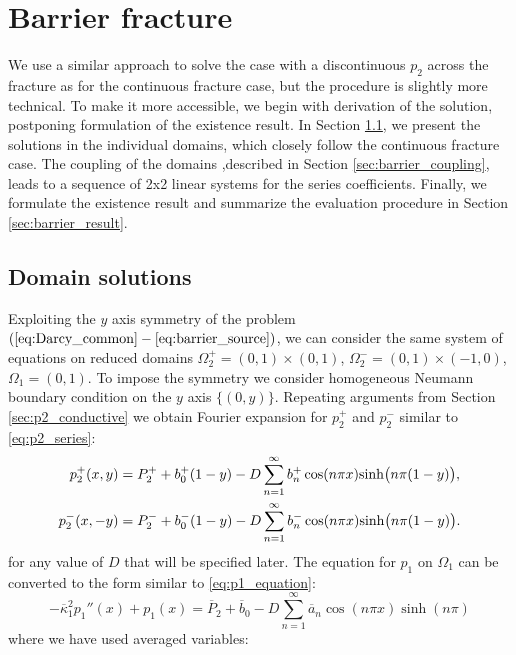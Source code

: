 \documentclass[sn-mathphys,Numbered]{sn-jnl}
\def\ol#1{\overline{#1}}
\begin{document}
\section{Barrier fracture}
\label{sec:barrier_frac}
We use a similar approach to solve the case with a discontinuous $p_2$ across the fracture as for the continuous fracture case, but the procedure is slightly more technical. To make it more accessible, we begin with derivation of the solution, postponing formulation of the existence result. In Section \ref{sec:dom_sol}, we present the solutions in the individual domains, which closely follow the continuous fracture case.  The coupling of the domains ,described in Section \ref{sec:barrier_coupling}, leads to a sequence of 2x2 linear systems for the series coefficients. Finally, we formulate the existence result and summarize the evaluation procedure in Section
\ref{sec:barrier_result}.


\subsection{Domain solutions}
\label{sec:dom_sol}
Exploiting the $y$ axis symmetry of the problem $(\ref{eq:Darcy_common} - \ref{eq:barrier_source})$, we can consider the same system of equations 
on reduced domains $\Omega_2^+ = (0,1)\times (0,1)$, $\Omega_2^- = (0,1)\times(-1,0)$,
$\Omega_1 = (0,1)$. To impose the symmetry we consider homogeneous Neumann boundary condition on the $y$ axis $\{(0,y)\}$.
Repeating arguments from Section \ref{sec:p2_conductive} we obtain Fourier expansion for $p_2^+$ and $p_2^-$ similar to \eqref{eq:p2_series}:
\begin{align}
    \label{eq:p2_barrier_p}
    p_2^+(x,  y) &= P_2^+ + b_0^+(1-y) - D\sum_{n=1}^\infty b_n^+ \cos(n \pi x) {\rm sinh} \big(n \pi(1-y)\big),\\ 
    \label{eq:p2_barrier_m}
    p_2^-(x, -y) &= P_2^- + b_0^-(1-y) - D\sum_{n=1}^\infty b_n^- \cos(n \pi x) {\rm sinh} \big(n \pi(1-y)\big).
\end{align}
for any value of $D$ that will be specified later.
%
The equation for $p_1$ on $\Omega_1$ can be converted to the form similar to \eqref{eq:p1_equation}:
\begin{equation}
    \label{eq:p1_barrier_equation}
    - \ol{\kappa}_1^2  p_1''(x) + p_1(x) = \ol{P}_2 + \ol{b}_0 - D\sum_{n=1}^{\infty} \ol{a}_n \cos(n \pi x) \sinh(n \pi)
\end{equation}
where we have used averaged variables:

\end{document}
